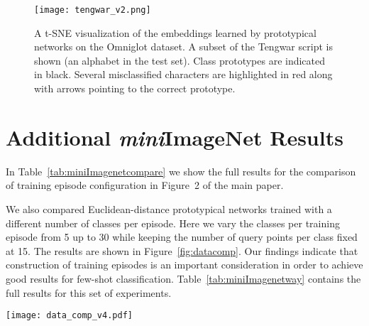 \documentclass{article}
\begin{document}
\begin{figure}[tb]
    \centering
    \texttt{[image: tengwar\_v2.png]}
    \caption{A t-SNE visualization of the embeddings learned by  prototypical networks on the Omniglot dataset. A subset of the Tengwar script is shown (an alphabet in the test set). Class prototypes are indicated in black. Several misclassified characters are highlighted in red along with arrows pointing to the correct prototype.}
    \label{fig:tengwar}
\end{figure}

\section{Additional \emph{mini}ImageNet Results}

In Table~\ref{tab:miniImagenetcompare} we show the full results for the comparison of training episode configuration in Figure~2 of the main paper. 

We also compared Euclidean-distance prototypical networks trained with a different number of classes per episode. Here we vary the classes per training episode from 5 up to 30 while keeping the number of query points per class fixed at 15. The results are shown in Figure~\ref{fig:datacomp}.
Our findings indicate that construction of training episodes is an important consideration in order to achieve good results for few-shot classification.
Table~\ref{tab:miniImagenetway} contains the full results for this set of experiments. 

 \begin{figure*}[bt]
     \centering
     \texttt{[image: data\_comp\_v4.pdf]}
     \caption{Comparison of the effect of training ``way'' (number of classes per episode) for prototypical networks trained on \emph{mini}ImageNet. Each training episode contains 15 query points per class. Error bars indicate 95\% confidence intervals as computed over 600 test episodes.}
     \label{fig:datacomp}
 \end{figure*}
\end{document}
